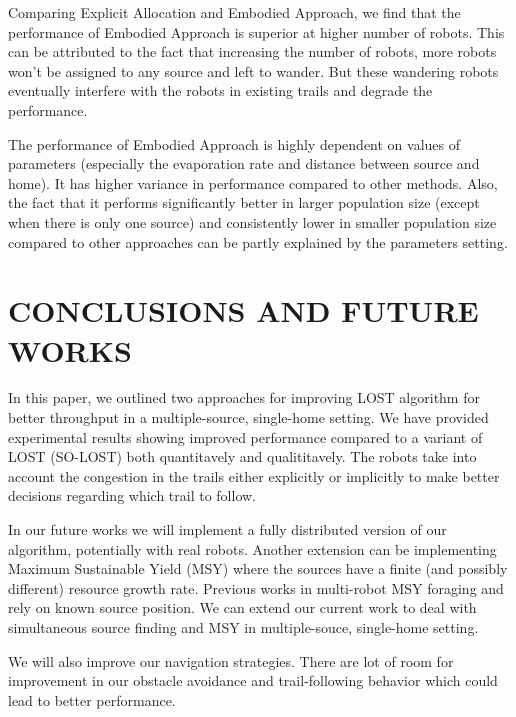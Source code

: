 \documentclass[letterpaper, 10 pt, conference]{ieeeconf}  %
\begin{document}
Comparing Explicit Allocation and Embodied Approach, we find that the performance of Embodied Approach is superior at higher number of robots. This can be attributed to the fact that increasing the number of robots, more robots won't be assigned to any source and left to wander. But these wandering robots eventually interfere with the robots in existing trails and degrade the performance. 

The performance of Embodied Approach is highly dependent on values of parameters (especially the evaporation rate and distance between source and home). It has higher variance in performance compared to other methods. Also, the fact that it performs significantly better in larger population size (except when there is only one source) and consistently lower in smaller population size compared to other approaches can be partly explained by the parameters setting.


\section{CONCLUSIONS AND FUTURE WORKS}

In this paper, we outlined two approaches for improving LOST algorithm for better throughput in a multiple-source, single-home setting. We have provided experimental results showing improved performance compared to a variant of LOST (SO-LOST) both quantitavely and qualititavely.  The robots take into account the congestion in the trails either explicitly or implicitly to make better decisions regarding which trail to follow. 

In our future works we will implement a fully distributed version of our algorithm, potentially with real robots. Another extension can be implementing Maximum Sustainable Yield (MSY) \cite{MSY_Hjor1933} where the sources have a finite (and possibly different) resource growth rate. Previous works in multi-robot MSY foraging \cite{songmulti} and \cite{zhangmaximum} rely on known source position. We can extend our current work to deal with simultaneous source finding and MSY in multiple-souce, single-home setting. 

We will also improve our navigation strategies. There are lot of room for improvement in our obstacle avoidance and trail-following behavior which could lead to better performance. 


\addtolength{\textheight}{-12cm}   %
\end{document}
